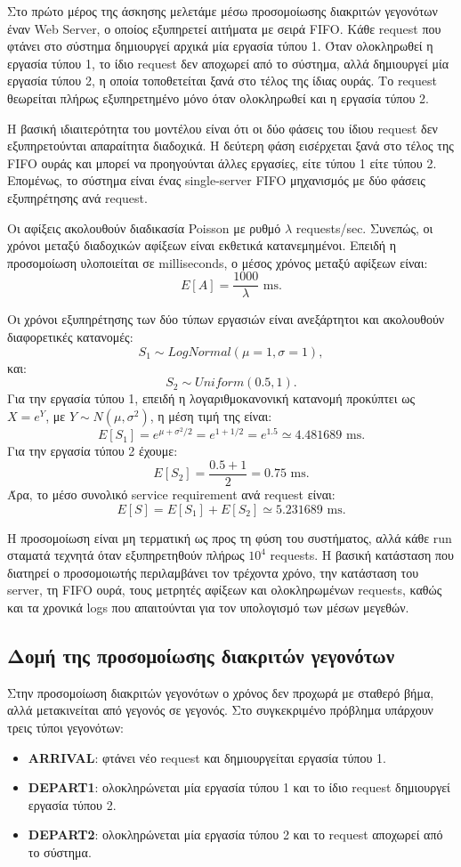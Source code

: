 \documentclass{article}
\begin{document}
Στο πρώτο μέρος της άσκησης μελετάμε μέσω προσομοίωσης διακριτών γεγονότων έναν Web Server, ο οποίος εξυπηρετεί αιτήματα με σειρά FIFO. Κάθε request που φτάνει στο σύστημα δημιουργεί αρχικά μία εργασία τύπου 1. Όταν ολοκληρωθεί η εργασία τύπου 1, το ίδιο request δεν αποχωρεί από το σύστημα, αλλά δημιουργεί μία εργασία τύπου 2, η οποία τοποθετείται ξανά στο τέλος της ίδιας ουράς. Το request θεωρείται πλήρως εξυπηρετημένο μόνο όταν ολοκληρωθεί και η εργασία τύπου 2.

Η βασική ιδιαιτερότητα του μοντέλου είναι ότι οι δύο φάσεις του ίδιου request δεν εξυπηρετούνται απαραίτητα διαδοχικά. Η δεύτερη φάση εισέρχεται ξανά στο τέλος της FIFO ουράς και μπορεί να προηγούνται άλλες εργασίες, είτε τύπου 1 είτε τύπου 2. Επομένως, το σύστημα είναι ένας single-server FIFO μηχανισμός με δύο φάσεις εξυπηρέτησης ανά request.

Οι αφίξεις ακολουθούν διαδικασία Poisson με ρυθμό $\lambda$ requests/sec. Συνεπώς, οι χρόνοι μεταξύ διαδοχικών αφίξεων είναι εκθετικά κατανεμημένοι. Επειδή η προσομοίωση υλοποιείται σε milliseconds, ο μέσος χρόνος μεταξύ αφίξεων είναι:
\[
    E[A] = \frac{1000}{\lambda} \text{ ms}.
\]

Οι χρόνοι εξυπηρέτησης των δύο τύπων εργασιών είναι ανεξάρτητοι και ακολουθούν διαφορετικές κατανομές:
\[
    S_1 \sim LogNormal(\mu=1,\sigma=1),
\]
και:
\[
    S_2 \sim Uniform(0.5,1).
\]
Για την εργασία τύπου 1, επειδή η λογαριθμοκανονική κατανομή προκύπτει ως $X=e^Y$, με $Y \sim N(\mu,\sigma^2)$, η μέση τιμή της είναι:
\[
    E[S_1] = e^{\mu + \sigma^2/2} = e^{1+1/2} = e^{1.5} \simeq 4.481689 \text{ ms}.
\]
Για την εργασία τύπου 2 έχουμε:
\[
    E[S_2] = \frac{0.5+1}{2} = 0.75 \text{ ms}.
\]
Άρα, το μέσο συνολικό service requirement ανά request είναι:
\[
    E[S] = E[S_1] + E[S_2] \simeq 5.231689 \text{ ms}.
\]

Η προσομοίωση είναι μη τερματική ως προς τη φύση του συστήματος, αλλά κάθε run σταματά τεχνητά όταν εξυπηρετηθούν πλήρως $10^4$ requests. Η βασική κατάσταση που διατηρεί ο προσομοιωτής περιλαμβάνει τον τρέχοντα χρόνο, την κατάσταση του server, τη FIFO ουρά, τους μετρητές αφίξεων και ολοκληρωμένων requests, καθώς και τα χρονικά logs που απαιτούνται για τον υπολογισμό των μέσων μεγεθών.

\subsection{Δομή της προσομοίωσης διακριτών γεγονότων}

Στην προσομοίωση διακριτών γεγονότων ο χρόνος δεν προχωρά με σταθερό βήμα, αλλά μετακινείται από γεγονός σε γεγονός. Στο συγκεκριμένο πρόβλημα υπάρχουν τρεις τύποι γεγονότων:
\begin{itemize}
    \item \textbf{ARRIVAL}: φτάνει νέο request και δημιουργείται εργασία τύπου 1.
    \item \textbf{DEPART1}: ολοκληρώνεται μία εργασία τύπου 1 και το ίδιο request δημιουργεί εργασία τύπου 2.
    \item \textbf{DEPART2}: ολοκληρώνεται μία εργασία τύπου 2 και το request αποχωρεί από το σύστημα.
\end{itemize}
\end{document}
